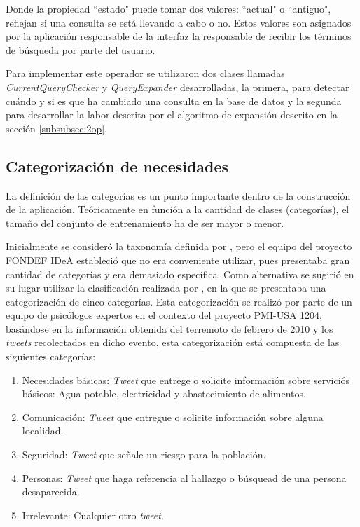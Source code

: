 Donde la propiedad ``estado" puede tomar dos valores: ``actual" o ``antiguo", reflejan si una consulta se está llevando a cabo o no. Estos valores son asignados por la aplicación responsable de la interfaz la responsable de recibir los términos de búsqueda por parte del usuario.

Para implementar este operador se utilizaron dos clases llamadas \textit{CurrentQueryChecker} y \textit{QueryExpander} desarrolladas, la primera, para detectar cuándo y si es que ha cambiado una consulta en la base de datos y la segunda para desarrollar la labor descrita por el algoritmo de expansión descrito en la sección \ref{subsubsec:2op}.

\subsection{Categorización de necesidades}
\label{sec:diseno:categorias}

La definición de las categorías es un punto importante dentro de la construcción de la aplicación. Teóricamente en función a la cantidad de clases (categorías), el tamaño del conjunto de entrenamiento ha de ser mayor o menor.

Inicialmente se consideró la taxonomía definida por \cite{TaxonomiaChato}, pero el equipo del proyecto FONDEF IDeA estableció que no era conveniente utilizar, pues presentaba gran cantidad de categorías y era demasiado específica. Como alternativa se sugirió en su lugar utilizar la clasificación realizada por \cite{PMIProfes}, en la que se presentaba una categorización de cinco categorías. Esta categorización se realizó por parte de un equipo de psicólogos expertos en el contexto del proyecto PMI-USA 1204, basándose en la información obtenida del terremoto de febrero de 2010 y los \textit{tweets} recolectados en dicho evento, esta categorización está compuesta de las siguientes categorías:

\begin{enumerate}
\item Necesidades básicas: \textit{Tweet} que entrege o solicite información sobre serviciós básicos: Agua potable, electricidad y abastecimiento de alimentos.
\item Comunicación: \textit{Tweet} que entregue o solicite información sobre alguna localidad.
\item Seguridad: \textit{Tweet} que señale un riesgo para la población.
\item Personas: \textit{Tweet} que haga referencia al hallazgo o búsquead de una persona desaparecida.
\item Irrelevante: Cualquier otro \textit{tweet}.
\end{enumerate}

